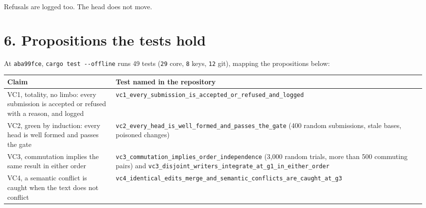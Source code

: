 \documentclass[10pt,letterpaper]{article}
\newcounter{none}
\begin{document}
Refusals are logged too. The head does not move.

\section{6. Propositions the tests
hold}\label{propositions-the-tests-hold}

At \texttt{aba99fce}, \texttt{cargo\ test\ -\allowbreak{}\/\allowbreak{}-\allowbreak{}offline} runs 49 tests
(\texttt{29} core, \texttt{8} keys, \texttt{12} git), mapping the
propositions below:

{\def\LTcaptype{none} %
{\footnotesize\setlength{\tabcolsep}{3.8pt}\renewcommand{\arraystretch}{1.15}
\begin{longtable}[]{@{}
  >{\raggedright\arraybackslash}p{}
  >{\raggedright\arraybackslash}p{}@{}}
\toprule\noalign{}
\begin{minipage}[b]{\linewidth}\raggedright
\textbf{Claim}
\end{minipage} & \begin{minipage}[b]{\linewidth}\raggedright
\textbf{Test named in the repository}
\end{minipage} \\
\midrule\noalign{}
\endhead
\bottomrule\noalign{}
\endlastfoot
VC1, totality, no limbo: every submission is accepted or refused with a
reason, and logged &
\texttt{vc1\_\allowbreak{}every\_\allowbreak{}submission\_\allowbreak{}is\_\allowbreak{}accepted\_\allowbreak{}or\_\allowbreak{}refused\_\allowbreak{}and\_\allowbreak{}logged} \\
VC2, green by induction: every head is well formed and passes the gate &
\texttt{vc2\_\allowbreak{}every\_\allowbreak{}head\_\allowbreak{}is\_\allowbreak{}well\_\allowbreak{}formed\_\allowbreak{}and\_\allowbreak{}passes\_\allowbreak{}the\_\allowbreak{}gate} (400
random submissions, stale bases, poisoned changes) \\
VC3, commutation implies the same result in either order &
\texttt{vc3\_\allowbreak{}commutation\_\allowbreak{}implies\_\allowbreak{}order\_\allowbreak{}independence} (3,000 random
trials, more than 500 commuting pairs) and
\texttt{vc3\_\allowbreak{}disjoint\_\allowbreak{}writers\_\allowbreak{}integrate\_\allowbreak{}at\_\allowbreak{}g1\_\allowbreak{}in\_\allowbreak{}either\_\allowbreak{}order} \\
VC4, a semantic conflict is caught when the text does not conflict &
\texttt{vc4\_\allowbreak{}identical\_\allowbreak{}edits\_\allowbreak{}merge\_\allowbreak{}and\_\allowbreak{}semantic\_\allowbreak{}conflicts\_\allowbreak{}are\_\allowbreak{}caught\_\allowbreak{}at\_\allowbreak{}g3}

\end{longtable}}}
\end{document}
